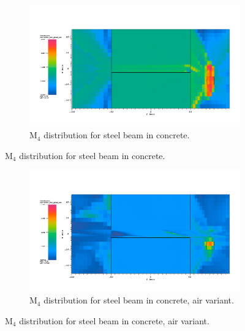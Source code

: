 \begin{figure}[htb!]
  \centering
  \begin{subfigure}[t]{\textwidth}
    \includegraphics[width=0.9\linewidth]{./chapters/characterization_probs/figures/char/prob_1/prob1M4G26.png}
    \caption{M$_4$ distribution for steel beam in concrete.}
    \label{fig:M4steel}
  \end{subfigure}
\end{figure}
\begin{figure}[htb!]\ContinuedFloat
  \centering
  \begin{subfigure}[t]{\textwidth}
    \includegraphics[width=0.9\linewidth]{./chapters/characterization_probs/figures/char/prob1v1/prob1v1M4G26.png}
    \caption{M$_4$ distribution for steel beam in concrete, air variant.}
    \label{fig:M4air}
  \end{subfigure}
\end{figure}
